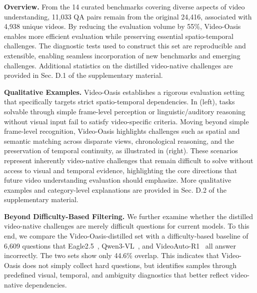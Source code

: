 \documentclass[runningheads]{llncs}
\begin{document}
{        \par\smallskip
        \noindent \textbf{Overview.} 
        From the 14 curated benchmarks covering diverse aspects of video understanding, 11,033 QA pairs remain from the original 24,416, associated with 4,938 unique videos. 
        By reducing the evaluation volume by 55\%, Video-Oasis enables more efficient evaluation while preserving essential spatio-temporal challenges. 
        The diagnostic tests used to construct this set are reproducible and extensible, enabling seamless incorporation of new benchmarks and emerging challenges. 
        Additional statistics on the distilled video-native challenges are provided in Sec. D.1 of the supplementary material.

        \par\smallskip
        \noindent \textbf{Qualitative Examples.} 
        Video-Oasis establishes a rigorous evaluation setting that specifically targets strict spatio-temporal dependencies.
        In (left), tasks solvable through simple frame-level perception or linguistic/auditory reasoning without visual input fail to satisfy video-specific criteria.
        Moving beyond simple frame-level recognition, Video-Oasis highlights challenges such as spatial and semantic matching across disparate views, chronological reasoning, and the preservation of temporal continuity, as illustrated in (right).
        These scenarios represent inherently video-native challenges that remain difficult to solve without access to visual and temporal evidence, highlighting the core directions that future video understanding evaluation should emphasize.
        More qualitative examples and category-level explanations are provided in Sec. D.2 of the supplementary material.

        \noindent\textbf{Beyond Difficulty-Based Filtering.} 
        We further examine whether the distilled video-native challenges are merely difficult questions for current models. 
        To this end, we compare the Video-Oasis-distilled set with a difficulty-based baseline of 6,609 questions that Eagle2.5~\cite{eagle25}, Qwen3-VL~\cite{qwem3_vl}, and VideoAuto-R1~\cite{videoautor1} all answer incorrectly.
        The two sets show only 44.6\% overlap.
        This indicates that Video-Oasis does not simply collect hard questions, but identifies samples through predefined visual, temporal, and ambiguity diagnostics that better reflect video-native dependencies.
        
}
\end{document}
